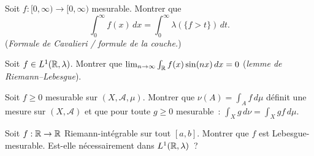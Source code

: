\begin{exercice}
Soit $f : [0, \infty) \to [0, \infty)$ mesurable. Montrer que
\[
\int_0^\infty f(x)\, dx = \int_0^\infty \lambda(\{f > t\})\, dt.
\]
(\emph{Formule de Cavalieri / formule de la couche.})
\end{exercice}

\begin{exercice}
Soit $f \in L^1(\mathbb{R}, \lambda)$. Montrer que
$\lim_{n \to \infty} \int_{\mathbb{R}} f(x) \sin(nx)\, dx = 0$
(\emph{lemme de Riemann--Lebesgue}).
\end{exercice}

\begin{exercice}
Soit $f \geq 0$ mesurable sur $(X, \mathcal{A}, \mu)$. Montrer que
$\nu(A) = \int_A f\, d\mu$ d\'efinit une mesure sur $(X, \mathcal{A})$ et que
pour toute $g \geq 0$ mesurable~:
$\int_X g\, d\nu = \int_X gf\, d\mu$.
\end{exercice}

\begin{exercice}
Soit $f : \mathbb{R} \to \mathbb{R}$ Riemann-int\'egrable sur tout $[a, b]$. Montrer que $f$ est
Lebesgue-mesurable. Est-elle n\'ecessairement dans $L^1(\mathbb{R}, \lambda)$~?
\end{exercice}
